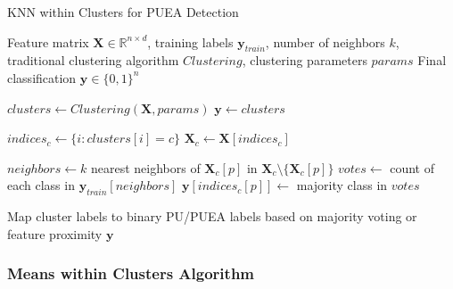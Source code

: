 \begin{algorithm}[H]
\caption{KNN within Clusters for PUEA Detection}
\label{alg:knn_clusters_full}
\begin{algorithmic}[1]
\Require Feature matrix $\mathbf{X} \in \mathbb{R}^{n \times d}$, training labels $\mathbf{y}_{train}$, number of neighbors $k$, traditional clustering algorithm $Clustering$, clustering parameters $params$
\Ensure Final classification $\mathbf{y} \in \{0,1\}^n$

\State $clusters \gets Clustering(\mathbf{X}, params)$ 
\State $\mathbf{y} \gets clusters$ 

    \State $indices_c \gets \{i: clusters[i] = c\}$ 
    \State $\mathbf{X}_c \gets \mathbf{X}[indices_c]$ 
    
     
            \State $neighbors \gets k$ nearest neighbors of $\mathbf{X}_c[p]$ in $\mathbf{X}_c \setminus \{\mathbf{X}_c[p]\}$
            \State $votes \gets$ count of each class in $\mathbf{y}_{train}[neighbors]$
            \State $\mathbf{y}[indices_c[p]] \gets$ majority class in $votes$
        \EndFor
    \EndIf
\EndFor

\State Map cluster labels to binary PU/PUEA labels based on majority voting or feature proximity
\State \Return $\mathbf{y}$
\end{algorithmic}
\end{algorithm}

\subsubsection{Means within Clusters Algorithm}


